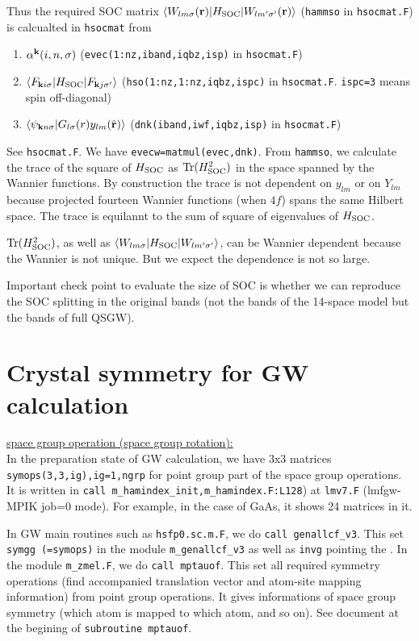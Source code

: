\documentclass[a4paper,10pt,fleqn]{article}
\def\tr{{\rm Tr}}
\newcommand{\bfk}{{\bf k}}
\newcommand{\bfr}{{\bf r}}
\begin{document}
Thus the required SOC matrix
 $\langle W_{lm\sigma}(\bfr) | H_{\rm SOC} |W_{lm'\sigma'}(\bfr) \rangle$
(\verb$hammso$ in \verb#hsocmat.F#) is calcualted in \verb#hsocmat# from
\begin{enumerate}
\item 
$\alpha^\bfk(i,n,\sigma)$ (\verb#evec(1:nz,iband,iqbz,isp)# in \verb#hsocmat.F#)
\item 
$\langle F_{\bfk i\sigma} |H_{\rm SOC}|F_{\bfk j\sigma'} \rangle$
(\verb#hso(1:nz,1:nz,iqbz,ispc)# in \verb#hsocmat.F#. \verb$ispc=3$ means spin off-diagonal)
\item 
$\langle \psi_{\bfk n\sigma}|G_{l\sigma}(r)y_{lm}(\hat{\bfr})\rangle$
(\verb#dnk(iband,iwf,iqbz,isp)# in \verb#hsocmat.F#)
\end{enumerate}
See \verb#hsocmat.F#. We have \verb$evecw=matmul(evec,dnk)$. 
From \verb$hammso$, we calculate the trace of the 
square of $H_{\rm SOC}$ as $\tr(H_{\rm SOC}^2)$ in the space spanned by the Wannier functions.
By construction the trace is not dependent on $y_{lm}$ or on $Y_{lm}$ because projected fourteen Wannier functions (when $4f$) spans the same Hilbert space. The trace is equilannt to the sum of square of eigenvalues
of $H_{\rm SOC}$.

$\tr(H_{\rm SOC}^2)$, as well as
$\langle W_{lm \sigma}| H_{\rm SOC} |W_{lm'\sigma'} \rangle$,
can be Wannier dependent because the Wannier is not unique.
But we expect the dependence is not so large.

Important check point to evaluate the size of SOC is whether we can reproduce the SOC splitting in the original bands
 (not the bands of the 14-space model but the bands of full QSGW).


\section{Crystal symmetry for GW calculation}
\noindent \underline{space group operation (space group rotation):}\\

In the preparation state of GW calculation, we have
3x3 matrices \verb#symops(3,3,ig),ig=1,ngrp#
for point group part of the space group operations.
It is written in \verb#call m_hamindex_init,m_hamindex.F:L128#) at \verb#lmv7.F# (lmfgw-MPIK job=0 mode).
For example, in the case of GaAs, it shows 24 matrices in it.

In GW main routines such as \verb#hsfp0.sc.m.F#,
we do \verb#call genallcf_v3#. This set \verb#symgg (=symops)# in
the module \verb#m_genallcf_v3# as well as \verb#invg# pointing the .
In the module \verb#m_zmel.F#, we do \verb#call mptauof#.
This set all required symmetry operations (find accompanied translation vector 
and atom-site mapping information)
from point group operations. It gives informations of space group symmetry 
(which atom is mapped to which atom, and so on).
See document at the begining of \verb#subroutine mptauof#.
\end{document}
